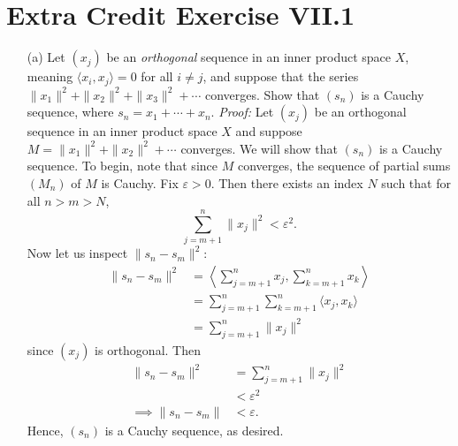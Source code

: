\documentclass{article}
\begin{document}
\section*{Extra Credit Exercise VII.1}
\begin{itemize}
    \item[(a)] Let $(x_j)$ be an \textit{orthogonal} sequence in an inner product space $X$, meaning $\langle x_i, x_j \rangle = 0$ for all $i \neq j$, and suppose that the series $\|x_1\|^2 + \|x_2\|^2 + \|x_3\|^2 + \cdots$ converges. Show that $(s_n)$ is a Cauchy sequence, where $s_n = x_1 + \cdots + x_n$.
    \newline\newline
    \textit{Proof:} Let $(x_j)$ be an orthogonal sequence in an inner product space $X$ and suppose $M = \|x_1\|^2 + \|x_2\|^2 + \cdots$ converges. We will show that $(s_n)$ is a Cauchy sequence. To begin, note that since $M$ converges, the sequence of partial sums $(M_n)$ of $M$ is Cauchy. Fix $\varepsilon > 0$. Then there exists an index $N$ such that for all $n > m > N$, 
    \[\sum_{j = m+1}^n \|x_j\|^2 < \varepsilon^2.\]
    Now let us inspect $\|s_n - s_m\|^2$:
    \begin{align*}
        \|s_n - s_m\|^2 &= \left\langle \sum_{j = m + 1}^n x_j, \sum_{k = m+1}^n x_k \right\rangle\\
        &= \sum_{j = m+1}^n\sum_{k = m+1}^n \langle x_j, x_k\rangle\\
        &= \sum_{j = m+1}^n \|x_j\|^2
    \end{align*}
    since $(x_j)$ is orthogonal. Then
    \begin{align*}
        \|s_n - s_m\|^2 &= \sum_{j = m+1}^n \|x_j\|^2\\
        &< \varepsilon^2\\
        \implies \|s_n - s_m\| &< \varepsilon.
    \end{align*}
    Hence, $(s_n)$ is a Cauchy sequence, as desired.


\end{itemize}
\end{document}
